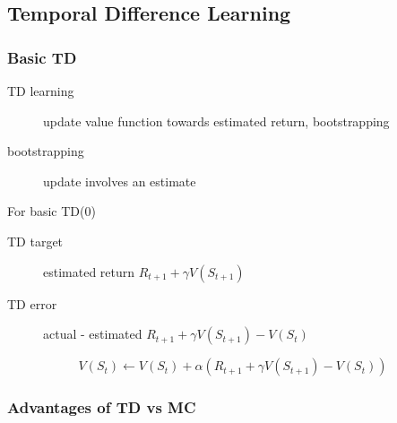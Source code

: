 \documentclass[]{article}
\theoremstyle{definition}
\begin{document}
\subsection{Temporal Difference Learning}%
\label{sub:temporal_difference_learning}

\subsubsection{Basic TD}%
\label{ssub:basic_td}
\begin{description}
    \item[TD learning] update value function towards estimated return, bootstrapping
    \item[bootstrapping] update involves an estimate
\end{description}
For basic TD(0)
\begin{description}
    \item[TD target] estimated return $R_{t+1} + \gamma V(S_{t+1})$
    \item[TD error] actual - estimated $R_{t+1} + \gamma V(S_{t+1}) - V(S_t)$
\end{description}

\begin{equation*}
    V(S_t) \gets V(S_t) + \alpha(R_{t+1} + \gamma V(S_{t+1}) - V(S_t))
\end{equation*}

\subsubsection{Advantages of TD vs MC}%
\label{ssub:advantages_of_td}
\end{document}
